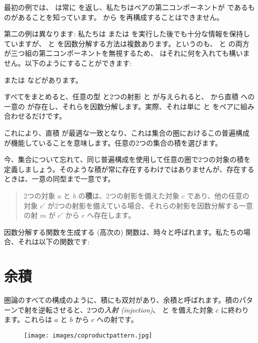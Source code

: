 最初の例では、 は常に  を返し、私たちはペアの第二コンポーネントが  であるものがあることを知っています。 から  を再構成することはできません。

第二の例は異なります: 私たちは  または  を実行した後でも十分な情報を保持していますが、 と  を因数分解する方法は複数あります。というのも、 と  の両方が三つ組の第二コンポーネントを無視するため、 はそれに何を入れても構いません。以下のようにすることができます: 


または
などがあります。

すべてをまとめると、任意の型  と2つの射影  と  が与えられると、 から直積  への一意の  が存在し、それらを因数分解します。実際、それは単に  と  をペアに組み合わせるだけです。

これにより、直積  が最適な一致となり、これは集合の圏におけるこの普遍構成が機能していることを意味します。任意の2つの集合の積を選びます。

今、集合について忘れて、同じ普遍構成を使用して任意の圏で2つの対象の積を定義しましょう。そのような積が常に存在するわけではありませんが、存在するときは、一意の同型まで一意です。

\begin{quote}
  2つの対象 $a$ と $b$ の\textbf{積}は、2つの射影を備えた対象 $c$ であり、他の任意の対象 $c'$ が2つの射影を備えている場合、それらの射影を因数分解する一意の射 $m$ が $c'$ から $c$ へ存在します。
\end{quote}

\noindent
因数分解する関数を生成する (高次の) 関数は、時々と呼ばれます。私たちの場合、それは以下の関数です: 


\section{余積}

圏論のすべての構成のように、積にも双対があり、余積と呼ばれます。積のパターンで射を逆転させると、2つの\emph{入射 (injection)}、 と  を備えた対象 $c$ に終わります。これらは $a$ と $b$ から $c$ への射です。


\begin{figure}[H]
  \centering
  \texttt{[image: images/coproductpattern.jpg]}
\end{figure}

